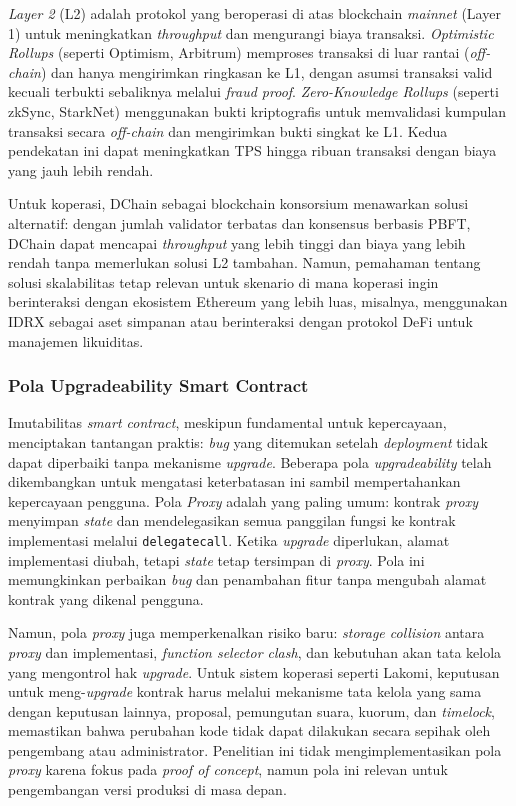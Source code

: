 \textit{Layer 2} (L2) adalah protokol yang beroperasi di atas blockchain \textit{mainnet} (Layer 1) untuk meningkatkan \textit{throughput} dan mengurangi biaya transaksi. \textit{Optimistic Rollups} (seperti Optimism, Arbitrum) memproses transaksi di luar rantai (\textit{off-chain}) dan hanya mengirimkan ringkasan ke L1, dengan asumsi transaksi valid kecuali terbukti sebaliknya melalui \textit{fraud proof}. \textit{Zero-Knowledge Rollups} (seperti zkSync, StarkNet) menggunakan bukti kriptografis untuk memvalidasi kumpulan transaksi secara \textit{off-chain} dan mengirimkan bukti singkat ke L1. Kedua pendekatan ini dapat meningkatkan TPS hingga ribuan transaksi dengan biaya yang jauh lebih rendah.

Untuk koperasi, DChain sebagai blockchain konsorsium menawarkan solusi alternatif: dengan jumlah validator terbatas dan konsensus berbasis PBFT, DChain dapat mencapai \textit{throughput} yang lebih tinggi dan biaya yang lebih rendah tanpa memerlukan solusi L2 tambahan. Namun, pemahaman tentang solusi skalabilitas tetap relevan untuk skenario di mana koperasi ingin berinteraksi dengan ekosistem Ethereum yang lebih luas, misalnya, menggunakan IDRX sebagai aset simpanan atau berinteraksi dengan protokol DeFi untuk manajemen likuiditas.

\subsubsection{Pola Upgradeability Smart Contract}

Imutabilitas \textit{smart contract}, meskipun fundamental untuk kepercayaan, menciptakan tantangan praktis: \textit{bug} yang ditemukan setelah \textit{deployment} tidak dapat diperbaiki tanpa mekanisme \textit{upgrade}. Beberapa pola \textit{upgradeability} telah dikembangkan untuk mengatasi keterbatasan ini sambil mempertahankan kepercayaan pengguna. Pola \textit{Proxy} adalah yang paling umum: kontrak \textit{proxy} menyimpan \textit{state} dan mendelegasikan semua panggilan fungsi ke kontrak implementasi melalui \texttt{delegatecall}. Ketika \textit{upgrade} diperlukan, alamat implementasi diubah, tetapi \textit{state} tetap tersimpan di \textit{proxy}. Pola ini memungkinkan perbaikan \textit{bug} dan penambahan fitur tanpa mengubah alamat kontrak yang dikenal pengguna.

Namun, pola \textit{proxy} juga memperkenalkan risiko baru: \textit{storage collision} antara \textit{proxy} dan implementasi, \textit{function selector clash}, dan kebutuhan akan tata kelola yang mengontrol hak \textit{upgrade}. Untuk sistem koperasi seperti Lakomi, keputusan untuk meng-\textit{upgrade} kontrak harus melalui mekanisme tata kelola yang sama dengan keputusan lainnya, proposal, pemungutan suara, kuorum, dan \textit{timelock}, memastikan bahwa perubahan kode tidak dapat dilakukan secara sepihak oleh pengembang atau administrator. Penelitian ini tidak mengimplementasikan pola \textit{proxy} karena fokus pada \textit{proof of concept}, namun pola ini relevan untuk pengembangan versi produksi di masa depan.

